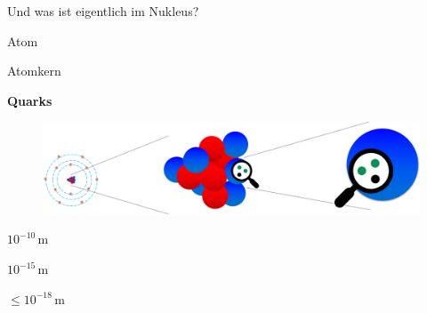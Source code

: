 \begin{frame}[t]{Und was ist eigentlich im Nukleus?}

    \begin{minipage}{\linewidth}
        \begin{minipage}{0.33\linewidth}
             \qquad Atom 
        \end{minipage}     
        \begin{minipage}{0.4\linewidth}
             \quad Atomkern 
        \end{minipage}    
        \begin{minipage}{0.24\linewidth}
            \quad\textbf{Quarks}
        \end{minipage}    
    \end{minipage} \vspace{0.5cm}
    
     \begin{minipage}{0.99\linewidth}
        \begin{figure}
            \centering
            \includegraphics[width=\textwidth]{Figures Introductory Lecture/Standard Model/Scale_Atom_Quark_noText_2.png}
            \label{fig:scale_atom_qaurk}
        \end{figure}
     \end{minipage}  
     \vspace{-15cm}
    \begin{minipage}{\linewidth}
        \begin{minipage}{0.33\linewidth}
            \qquad \Large $10^{-10}$\,m
        \end{minipage}     
        \begin{minipage}{0.33\linewidth}
             \quad \Large $10^{-15}$\,m
        \end{minipage}    
        \begin{minipage}{0.29\linewidth}
            \quad \Large $\leq10^{-18}$\,m
        \end{minipage}    
    \end{minipage}

\end{frame}
    
